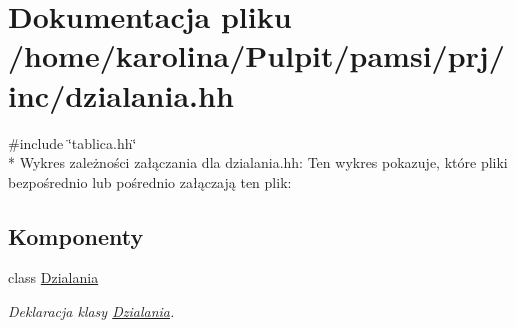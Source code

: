 \hypertarget{dzialania_8hh}{\section{Dokumentacja pliku /home/karolina/\-Pulpit/pamsi/prj/inc/dzialania.hh}
\label{dzialania_8hh}
}
{\ttfamily \#include \char`\"{}tablica.\-hh\char`\"{}}\\*
Wykres zależności załączania dla dzialania.\-hh\-:
Ten wykres pokazuje, które pliki bezpośrednio lub pośrednio załączają ten plik\-:
\subsection*{Komponenty}
\begin{DoxyCompactItemize}
\item 
class \hyperlink{class_dzialania}{Dzialania}
\begin{DoxyCompactList}\small\item\em Deklaracja klasy \hyperlink{class_dzialania}{Dzialania}. \end{DoxyCompactList}\end{DoxyCompactItemize}
